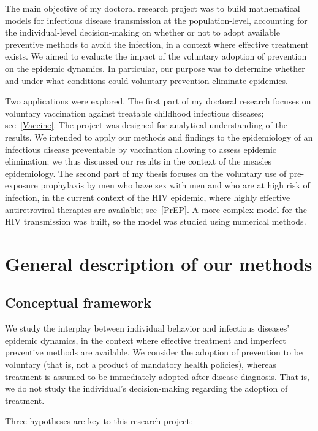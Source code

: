 The main objective of my doctoral research project was to build mathematical models for infectious disease transmission at the population-level, accounting for the individual-level decision-making on whether or not to adopt available preventive methods to avoid the infection, in a context where effective treatment exists. We aimed to evaluate the impact of the voluntary adoption of prevention on the epidemic dynamics. In particular, our purpose was to determine whether and under what conditions could voluntary prevention eliminate epidemics.

Two applications were explored. The first part of my doctoral research focuses on voluntary vaccination against treatable childhood infectious diseases; see~\autoref{Vaccine}. The project was designed for analytical understanding of the results. We intended to apply our methods and findings to the epidemiology of an infectious disease preventable by vaccination allowing to assess epidemic elimination; we thus discussed our results in the context of the measles epidemiology. The second part of my thesis focuses on the voluntary use of pre-exposure prophylaxis by men who have sex with men and who are at high risk of infection, in the current context of the HIV epidemic, where highly effective antiretroviral therapies are available; see~\autoref{PrEP}. A more complex model for the HIV transmission was built, so the model was studied using numerical methods.



\section{General description of our methods}

\subsection{Conceptual framework}
\label{Intro:Framework} 

We study the interplay between individual behavior and infectious diseases' epidemic dynamics, in the context where effective treatment and imperfect preventive methods are available. We consider the adoption of prevention to be voluntary (that is, not a product of mandatory health policies), whereas treatment is assumed to be immediately adopted after disease diagnosis. That is, we do not study the individual's decision-making regarding the adoption of treatment. 

Three hypotheses are key to this research project:

